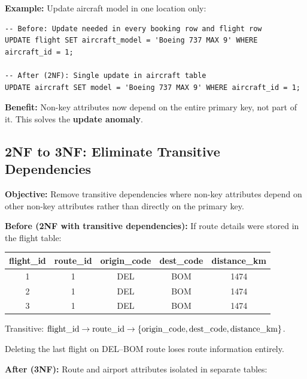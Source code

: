 \documentclass[12pt, a4paper]{article}
\begin{document}
\textbf{Example:} Update aircraft model in one location only:
\begin{lstlisting}[style=sqlstyle]
-- Before: Update needed in every booking row and flight row
UPDATE flight SET aircraft_model = 'Boeing 737 MAX 9' WHERE aircraft_id = 1;

-- After (2NF): Single update in aircraft table
UPDATE aircraft SET model = 'Boeing 737 MAX 9' WHERE aircraft_id = 1;
\end{lstlisting}

\textbf{Benefit:} Non-key attributes now depend on the entire primary key, not part of it. This solves the \textbf{update anomaly}.

\subsection{2NF to 3NF: Eliminate Transitive Dependencies}

\textbf{Objective:} Remove transitive dependencies where non-key attributes depend on other non-key attributes rather than directly on the primary key.

\textbf{Before (2NF with transitive dependencies):} If route details were stored in the flight table:
\begin{center}
\small
\begin{tabular}{|c|c|c|c|c|}
\hline
\textbf{flight\_id} & \textbf{route\_id} & \textbf{origin\_code} & \textbf{dest\_code} & \textbf{distance\_km} \\
\hline
1 & 1 & DEL & BOM & 1474 \\
\hline
2 & 1 & DEL & BOM & 1474 \\
\hline
3 & 1 & DEL & BOM & 1474 \\
\hline
\end{tabular}
\end{center}

Transitive: \({\rm flight\_id} \rightarrow {\rm route\_id} \rightarrow \{{\rm origin\_code}, {\rm dest\_code}, {\rm distance\_km}\}\).

Deleting the last flight on DEL--BOM route loses route information entirely.

\textbf{After (3NF):} Route and airport attributes isolated in separate tables:
\end{document}
